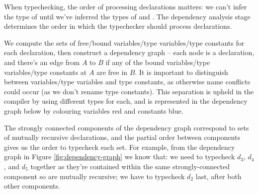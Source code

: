 \documentclass[dissertation.tex]{subfiles}
\begin{document}
{{{            When typechecking, the order of processing declarations matters: we can't infer the type of  until we've inferred the types of  and . The dependency analysis stage
            determines the order in which the typechecker should process declarations.

            We compute the sets of free/bound variables/type variables/type constants for each declaration, then
            construct a dependency graph -- each node is a declaration, and there's an edge from \(A\) to \(B\) if any
            of the bound variables/type variables/type constants at \(A\) are free in \(B\). It is important to
            distinguish between variables/type variables and type constants, as otherwise name conflicts could occur (as
            we don't rename type constants). This separation is upheld in the compiler by using different types for
            each, and is represented in the dependency graph below by colouring variables red and constants blue.

            The strongly connected components of the dependency graph correspond to sets of mutually recursive
            declarations, and the partial order between components gives us the order to typecheck each set. For
            example, from the dependency graph in Figure \ref{fig:dependency-graph} we know that: we need to typecheck
            \(d_3\), \(d_4\), and \(d_5\) together as they're contained within the same strongly-connected component so
            are mutually recursive; we have to typecheck \(d_2\) last, after both other components.

}}}
\end{document}

